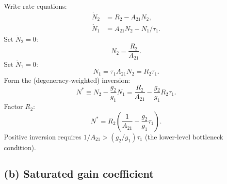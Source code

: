\documentclass[11pt]{article}
\begin{document}
Write rate equations:
\begin{align}
\dot N_{2}&= R_{2}-A_{21}N_{2},\label{eq:N2dot-noI}\\
\dot N_{1}&= A_{21}N_{2}-N_{1}/\tau_{1}. \label{eq:N1dot-noI}
\end{align}
Set $\dot N_{2}=0$:
\begin{equation}
N_{2}=\frac{R_{2}}{A_{21}}.
\end{equation}
Set $\dot N_{1}=0$:
\begin{equation}
N_{1}=\tau_{1}A_{21}N_{2}=R_{2}\tau_{1}.
\label{eq:NSS-noI}
\end{equation}
Form the (degeneracy-weighted) inversion:
\begin{equation}
N^{*}\equiv N_{2}-\frac{g_{2}}{g_{1}}N_{1}=\frac{R_{2}}{A_{21}}-\frac{g_{2}}{g_{1}}R_{2}\tau_{1}.
\end{equation}
Factor $R_{2}$:
\begin{equation}
\boxed{\;N^{*}=R_{2}\!\left(\frac{1}{A_{21}}-\frac{g_{2}}{g_{1}}\tau_{1}\right).\;}
\label{eq:NS-noI}
\end{equation}
Positive inversion requires $1/A_{21}>(g_{2}/g_{1})\tau_{1}$ (the lower-level bottleneck condition).

\subsection*{(b) Saturated gain coefficient}
\end{document}
